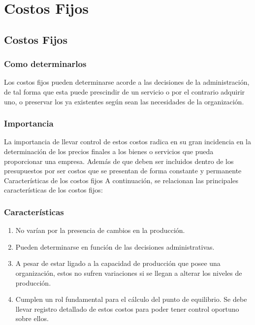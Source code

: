 \documentclass[../main]{subfiles}
\begin{document}
\chapter{Costos Fijos}
\section{Costos Fijos}
\subsection{Como determinarlos}
Los costos fijos pueden determinarse acorde a las decisiones de la
administración, de tal forma que esta puede prescindir de un servicio
o por el contrario adquirir uno, o preservar los ya existentes según
sean las necesidades de la organización.
\subsection{Importancia}
La importancia de llevar control de estos costos radica en su gran
incidencia en la determinación de los precios finales a los bienes o
servicios que pueda proporcionar una empresa. Además de que deben ser
incluidos dentro de los presupuestos por ser costos que se presentan
de forma constante y permanente
Características de los costos fijos
A continuación, se relacionan las principales características de los
costos fijos:
\subsection{Características}
\begin{enumerate}
  \item No varían por la presencia de cambios en la producción.
  \item Pueden determinarse en función de las decisiones administrativas.
  \item A pesar de estar ligado a la capacidad de producción que
    posee una organización, estos no sufren variaciones si se llegan
    a alterar los niveles de producción.
  \item Cumplen un rol fundamental para el cálculo del punto de equilibrio.
    Se debe llevar registro detallado de estos costos para poder
    tener control oportuno sobre ellos.
\end{enumerate}
\begin{center}
\end{center}
\end{document}
